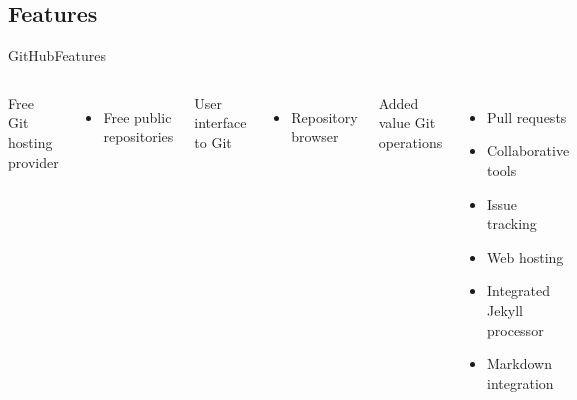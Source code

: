 \documentclass[10pt,compress]{beamer} %
\begin{document}
\subsection{Features}
\begin{frame}{GitHub}{Features}
	\begin{columns}
		Free Git hosting provider
		\begin{itemize}
			\item Free public repositories
		\end{itemize}
		User interface to Git
		\begin{itemize}
			\item Repository browser
		\end{itemize}
		Added value Git operations
		\begin{itemize}
			\item Pull requests	
			\item Collaborative tools
			\item Issue tracking
			\item Web hosting
			\item Integrated Jekyll processor
			\item Markdown integration
		\end{itemize}
	\begin{center}
 		\includegraphics[width=.8\textwidth]{figs/github-logo}
	\end{center}
	\end{columns}
\end{frame}
\end{document}
